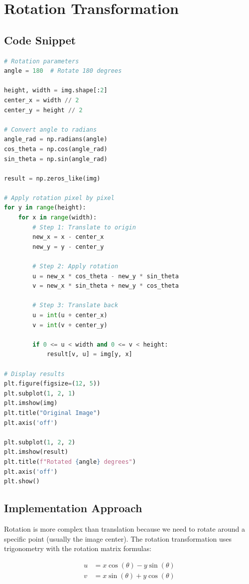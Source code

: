 \documentclass[12pt,a4paper]{report}
\begin{document}
\section{Rotation Transformation}

\subsection{Code Snippet}
\begin{lstlisting}[language=Python, caption={Manual Rotation Around Center}]
# Rotation parameters
angle = 180  # Rotate 180 degrees

height, width = img.shape[:2]
center_x = width // 2
center_y = height // 2

# Convert angle to radians
angle_rad = np.radians(angle)
cos_theta = np.cos(angle_rad)
sin_theta = np.sin(angle_rad)

result = np.zeros_like(img)

# Apply rotation pixel by pixel
for y in range(height):
    for x in range(width):
        # Step 1: Translate to origin
        new_x = x - center_x
        new_y = y - center_y
        
        # Step 2: Apply rotation
        u = new_x * cos_theta - new_y * sin_theta
        v = new_x * sin_theta + new_y * cos_theta
        
        # Step 3: Translate back
        u = int(u + center_x)
        v = int(v + center_y)
        
        if 0 <= u < width and 0 <= v < height:
            result[v, u] = img[y, x]

# Display results
plt.figure(figsize=(12, 5))
plt.subplot(1, 2, 1)
plt.imshow(img)
plt.title("Original Image")
plt.axis('off')

plt.subplot(1, 2, 2)
plt.imshow(result)
plt.title(f"Rotated {angle} degrees")
plt.axis('off')
plt.show()
\end{lstlisting}

\subsection{Implementation Approach}
Rotation is more complex than translation because we need to rotate around a specific point (usually the image center). The rotation transformation uses trigonometry with the rotation matrix formulas:

\begin{align*}
u &= x \cos(\theta) - y \sin(\theta) \\
v &= x \sin(\theta) + y \cos(\theta)
\end{align*}
\end{document}
